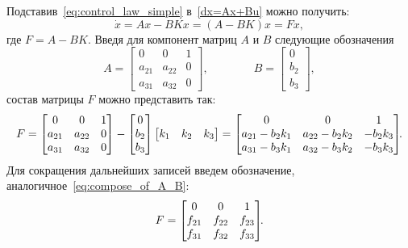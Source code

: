 \documentclass[12pt,a4paper,openany]{extarticle}
\begin{document}
Подставив~\eqref{eq:control_law_simple} в~\eqref{dx=Ax+Bu} можно получить:
\begin{equation}\label{eq:dx_Fx}
\dot x = Ax - BKx = (A - BK)x = Fx,
\end{equation}
где $F=A-BK$.
Введя для компонент матриц $A$ и $B$ следующие обозначения
\begin{equation}\label{eq:compose_of_A_B}
A = 
\begin{bmatrix}
0      & 0      & 1\\
a_{21} & a_{22} & 0\\
a_{31} & a_{32} & 0
\end{bmatrix}\!\!,\qquad\qquad
B = 
\begin{bmatrix}
0 \\ b_2 \\ b_3
\end{bmatrix}\!\!,
\end{equation}
состав матрицы $F$ можно представить так: 
\begin{equation}\label{eq:F_through_A_B}
F = 
\begin{bmatrix}
0      & 0      & 1\\
a_{21} & a_{22} & 0\\
a_{31} & a_{32} & 0
\end{bmatrix}
-
\begin{bmatrix}
0 \\ b_2 \\ b_3
\end{bmatrix}
\begin{bmatrix}
	k_1 & k_2 & k_3
\end{bmatrix}
=
\begin{bmatrix}
0             & 0             & 1\\
a_{21}-b_2k_1 & a_{22}-b_2k_2 & -b_2k_3\\
a_{31}-b_3k_1 & a_{32}-b_3k_2 & -b_3k_3
\end{bmatrix}\!\!\ldotp
\end{equation}
Для сокращения дальнейших записей введем обозначение, аналогичное~\eqref{eq:compose_of_A_B}:
\begin{equation}\label{eq:compose_of_F}
F = 
\begin{bmatrix}
0      & 0      & 1\\
f_{21} & f_{22} & f_{23}\\
f_{31} & f_{32} & f_{33}
\end{bmatrix}\!\!\ldotp
\end{equation}
\end{document}
